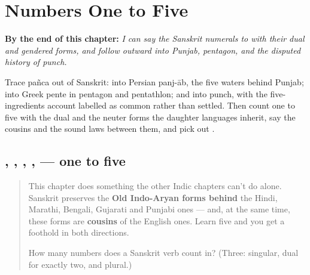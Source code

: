 
\chapter{Numbers One to Five}
\label{ch:numbers-one-to-five}

\begin{chapteropening}
\textbf{By the end of this chapter:} \emph{I can say the Sanskrit numerals  to  with their dual and gendered forms, and follow  outward into Punjab, pentagon, and the disputed history of punch.}

Trace pañca out of Sanskrit: into Persian panj-āb, the five waters behind Punjab; into Greek pente in pentagon and pentathlon; and into punch, with the five-ingredients account labelled as common rather than settled. Then count one to five with the dual and the neuter forms the daughter languages inherit, say the cousins and the sound laws between them, and pick out .
\end{chapteropening}

\section[\texorpdfstring{\sk{एक} \sk{द्व} \sk{त्रि} \sk{चतुर्} \sk{पञ्च} (eka dva tri …)}{एक द्व त्रि चतुर् पञ्च (eka dva tri …)}]{, , , ,  — one to five}

\label{lesson:SA-C06-numbers-1-5}



\begin{quote}
This chapter does something the other Indic chapters can't do alone. Sanskrit preserves the \textbf{Old Indo-Aryan forms behind} the Hindi, Marathi, Bengali, Gujarati and Punjabi ones — and, at the same time, these forms are \textbf{cousins} of the English ones. Learn five and you get a foothold in both directions.

How many numbers does a Sanskrit verb count in? (Three: singular, dual for exactly two, and plural.)
\end{quote}

